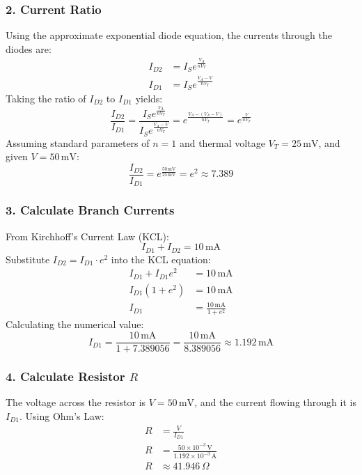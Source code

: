 \documentclass[12pt,a3paper]{article}
\begin{document}
\begin{enumerate}
\begin{tcolorbox}[enhanced,breakable,ansbox,colback=cA!4,colframe=cA,boxrule=0.8pt,arc=5pt,title={\textbf{Answer}},fonttitle=\bfseries\color{white},colbacktitle=cA]
\subsubsection*{2. Current Ratio}
Using the approximate exponential diode equation, the currents through the diodes are:
\begin{align}
    I_{D2} &= I_S e^{\frac{V_A}{n V_T}} \\
    I_{D1} &= I_S e^{\frac{V_A - V}{n V_T}}
\end{align}
Taking the ratio of $I_{D2}$ to $I_{D1}$ yields:
\begin{equation}
    \frac{I_{D2}}{I_{D1}} = \frac{I_S e^{\frac{V_A}{n V_T}}}{I_S e^{\frac{V_A - V}{n V_T}}} = e^{\frac{V_A - (V_A - V)}{n V_T}} = e^{\frac{V}{n V_T}}
\end{equation}
Assuming standard parameters of $n=1$ and thermal voltage $V_T = 25\,\text{mV}$, and given $V = 50\,\text{mV}$:
\begin{equation}
    \frac{I_{D2}}{I_{D1}} = e^{\frac{50\,\text{mV}}{25\,\text{mV}}} = e^2 \approx 7.389
\end{equation}

\subsubsection*{3. Calculate Branch Currents}
From Kirchhoff's Current Law (KCL):
\begin{equation}
    I_{D1} + I_{D2} = 10\,\text{mA}
\end{equation}
Substitute $I_{D2} = I_{D1} \cdot e^2$ into the KCL equation:
\begin{align}
    I_{D1} + I_{D1}e^2 &= 10\,\text{mA} \nonumber \\
    I_{D1}(1 + e^2) &= 10\,\text{mA} \nonumber \\
    I_{D1} &= \frac{10\,\text{mA}}{1 + e^2}
\end{align}
Calculating the numerical value:
\begin{equation}
    I_{D1} = \frac{10\,\text{mA}}{1 + 7.389056} = \frac{10\,\text{mA}}{8.389056} \approx 1.192\,\text{mA}
\end{equation}

\subsubsection*{4. Calculate Resistor $R$}
The voltage across the resistor is $V = 50\,\text{mV}$, and the current flowing through it is $I_{D1}$. Using Ohm's Law:
\begin{align}
    R &= \frac{V}{I_{D1}} \nonumber \\
    R &= \frac{50 \times 10^{-3}\,\text{V}}{1.192 \times 10^{-3}\,\text{A}} \nonumber \\
    R &\approx 41.946\,\Omega
\end{align}


\end{tcolorbox}
\end{enumerate}
\end{document}
